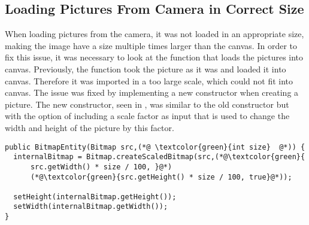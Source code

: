 \subsection{Loading Pictures From Camera in Correct Size}
When loading pictures from the camera, it was not loaded in an appropriate size, making the image have a size multiple times larger than the canvas.
In order to fix this issue, it was necessary to look at the function that loads the pictures into canvas.
Previously, the function took the picture as it was and loaded it into canvas.
Therefore it was imported in a too large scale, which could not fit into canvas.
The issue was fixed by implementing a new constructor when creating a picture.
The new constructor, seen in , was similar to the old constructor but with the option of including a scale factor as input that is used to change the width and height of the picture by this factor.


\begin{lstlisting}[caption={New Constructor for \textit{BitmapEntity}}, label=lst:BitmapEnity-Constructor-New, float=h]
public BitmapEntity(Bitmap src,(*@ \textcolor{green}{int size}  @*)) {
  internalBitmap = Bitmap.createScaledBitmap(src,(*@\textcolor{green}{
      src.getWidth() * size / 100, }@*)
      (*@\textcolor{green}{src.getHeight() * size / 100, true}@*));
  
  setHeight(internalBitmap.getHeight());
  setWidth(internalBitmap.getWidth());
}
\end{lstlisting}
